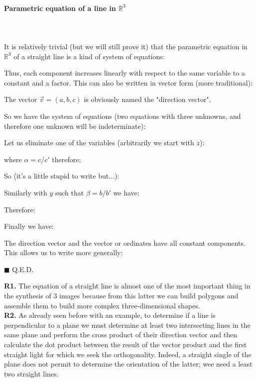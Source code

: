 	\paragraph{Parametric equation of a line in $\mathbb{R}^3$}\mbox{}\\\\
	It is relatively trivial (but we will still prove it) that the parametric equation in $\mathbb{R}^3$ of a straight line is a kind of system of equations:
	
	Thus, each component increases linearly with respect to the same variable to a constant and a factor. This can also be written in vector form (more traditional):
	
	The vector $\vec{v}=(a,b,c)$ is obviously named the "direction vector".
	\begin{dem}
	So we have the system of equations (two equations with three unknowns, and therefore one unknown will be indeterminate):
	
	Let us eliminate one of the variables (arbitrarily we start with $z$):
	
	where $\alpha=c/c'$ therefore:
	
	So (it's a little stupid to write but...):
	
	Similarly with $y$ such that $\beta=b/b'$ we have:
	
	Therefore:
	
	Finally we have:
	
	The direction vector and the vector or ordinates have all constant components. This allows us to write more generally:
	
	\begin{flushright}
		$\blacksquare$  Q.E.D.
	\end{flushright}
	\end{dem}
	\begin{tcolorbox}[title=Remarks,colframe=black,arc=10pt]
	\textbf{R1.} The equation of a straight line is almost one of the most important thing in the synthesis of 3 images because from this latter we can build polygons and assemble them to build more complex three-dimensional shapes.\\
	
	\textbf{R2.} As already seen before with an example, to determine if a line is perpendicular to a plane we must determine at least two intersecting lines in the same plane and perform the cross product of their direction vector and then calculate the dot product between the result of the vector product and the first straight light for which we seek the orthogonality. Indeed, a straight single of the plane does not permit to determine the orientation of the latter; wee need a least two straight lines.
	\end{tcolorbox}
	
